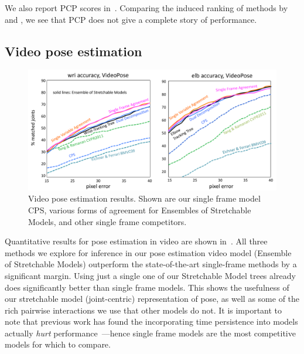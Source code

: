 We also report PCP scores in~.  Comparing the induced ranking 
of methods by  and , we see that 
PCP does not give a complete story of performance.

\subsection{Video pose estimation}
\begin{figure}[tb]
\begin{center}
\includegraphics[width=1.00\textwidth]{figs/results-vpose.pdf}
\caption[Video pose estimation results.]{Video pose estimation results.  Shown 
are our single frame model CPS, various forms of agreement for Ensembles of 
Stretchable Models, and other single frame competitors.}
\label{fig:results-vpose}
\end{center}
\end{figure}

Quantitative results for pose estimation in video are shown 
in~.  All three methods we explore for inference in our 
pose estimation video model (Ensemble of Stretchable Models) outperform the 
state-of-the-art single-frame methods by a significant margin.  Using just a 
single one of our Stretchable Model trees already does significantly better 
than single frame models.  This shows the usefulness of our stretchable model 
(joint-centric) representation of pose, as well as some of the rich pairwise 
interactions we use that other models do not.  It is important to note that 
previous work has found the incorporating time persistence into models actually 
{\em hurt } performance~\citep{posesearch,weisssapp10}---hence single frame 
models are the most competitive models for which to compare.

